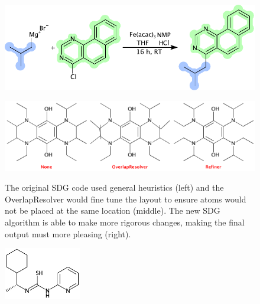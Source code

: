 \documentclass[10pt]{bmcart}
\begin{document}
\begin{backmatter}
\begin{figure}[h!]
  \caption{}
  \centering
  \includegraphics[width=\textwidth]{img/US20140231770A1_0287.pdf}
  \label{fig:depiction}
\end{figure}

\begin{figure}[h!]
  \caption{
    The original SDG code used general heuristics (left) and the
    OverlapResolver would fine tune the layout to ensure atoms would not be placed
    at the same location (middle). The new SDG algorithm is able to
    make more rigorous changes, making the final output must more pleasing
    (right).}
    \includegraphics[width=\textwidth]{sdg.png}
    \label{fig:sdg}
\end{figure}

\begin{figure}[h!]
  \caption{}
  \centering
  \includegraphics[width=0.3\textwidth]{sdg2.pdf}
  \label{fig:sdgstereo}
\end{figure}



\end{backmatter}
\end{document}
